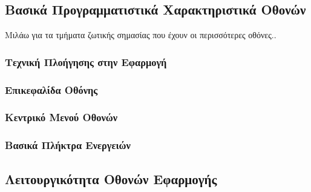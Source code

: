 \subsection{Βασικά Προγραμματιστικά Χαρακτηριστικά Οθονών}
Μιλάω για τα τμήματα ζωτικής σημασίας που έχουν οι περισσότερες οθόνες..

\subsubsection{Τεχνική Πλοήγησης στην Εφαρμογή}



\subsubsection{Επικεφαλίδα Οθόνης}



\subsubsection{Κεντρικό Μενού Οθονών}



\subsubsection{Βασικά Πλήκτρα Ενεργειών}



\subsection{Λειτουργικότητα Οθονών Εφαρμογής}



\subsubsection{}


\subsubsection{}


\subsubsection{}


\subsubsection{}


